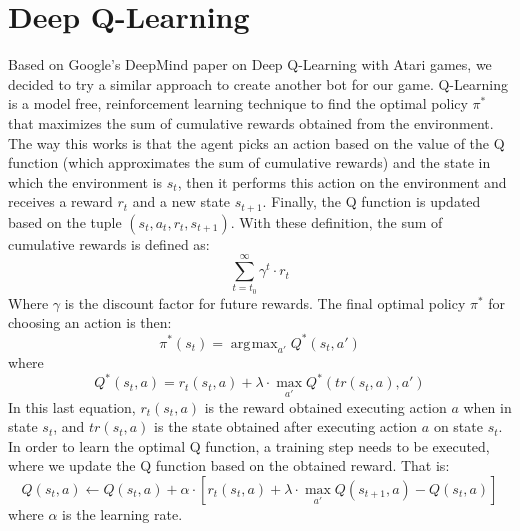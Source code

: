 \documentclass{article}
\DeclareMathOperator*{\argmax}{arg\!max}
\begin{document}
	\section{Deep Q-Learning}
	Based on Google's DeepMind paper on Deep Q-Learning with Atari games, we decided to try a similar approach to create another bot for our game. Q-Learning  is a model free, reinforcement learning technique to find the optimal policy $\pi^*$ that maximizes the sum of cumulative rewards obtained from the environment. The way this works is that the agent picks an action based on the value of the Q function (which approximates the sum of cumulative rewards) and the state in which the environment is $s_t$, then it performs this action on the environment and receives a reward $r_t$ and a new state $s_{t+1}$. Finally, the Q function is updated based on the tuple $(s_t,a_t,r_t,s_{t+1})$. With these definition, the sum of cumulative rewards is defined as: 
	\begin{equation}
	 \sum_{t=t_0}^\infty\gamma^t\cdot r_t   
	\end{equation}
	Where $\gamma$ is the discount factor for future rewards. The final optimal policy $\pi^*$ for choosing an action is then:
	\begin{equation}
	    \pi^*(s_t) = \argmax_{a'}Q^*(s_t,a')
	\end{equation}
	where
	\begin{equation}
	    Q^*(s_t,a) = r_t(s_t,a) + \lambda \cdot \max_{a'}Q^*(tr(s_t, a), a')
	\end{equation}
	In this last equation, $r_t(s_t,a)$ is the reward obtained executing action $a$ when in state $s_t$, and $tr(s_t, a)$ is the state obtained after executing action $a$ on state $s_t$. In order to learn the optimal Q function, a training step needs to be executed, where we update the Q function based on the obtained reward. That is:
	\begin{equation}
	    Q(s_t, a) \leftarrow Q(s_t,a) + \alpha\cdot[r_t(s_t,a)+\lambda\cdot\max_{a'}Q(s_{t+1},a) - Q(s_t,a)]
	\end{equation}
	where $\alpha$ is the learning rate.
	
\end{document}
